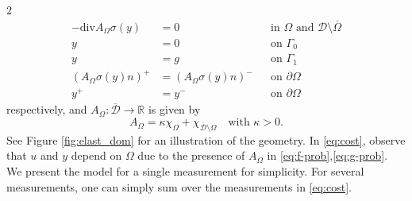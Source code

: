 \documentclass[a4paper, oneside]{article}
\newcommand{\Om}{\Omega}
\begin{document}
\begin{multicols}{2}
\begin{equation}
	\begin{aligned}
    -\mathrm{div} A_{\Omega} \sigma(y) &= 0 && \text{in } \Om  \text{ and } \mathcal{D}\setminus\overline \Omega \\
                                     y &= 0 && \text{on } \Gamma_{0} \\
                                     y &= g && \text{on } \Gamma_{1}   \\
			 (A_{\Omega} \sigma(y)n)^+ &= (A_{\Omega} \sigma(y)n)^- && \text{on } \partial\Omega\\      
								   y^+ &= y^- && \text{on } \partial\Om       
	\end{aligned}
\end{equation}
respectively, and $A_{\Omega}:\overline{\mathcal{D}} \rightarrow \mathds{R}$ is given by
\begin{equation}\label{eq:AOmega}
A_{\Omega} = \kappa\chi_{\Omega} + \chi_{\overline{\mathcal{D}}\setminus\Omega}
\quad \text{with }\kappa>0.
\end{equation}
See Figure \ref{fig:elast_dom} for an illustration of the geometry. In \eqref{eq:cost}, observe that $u$ and $y$ depend on $\Omega$ due to
the presence of $A_\Omega$ in \eqref{eq:f-prob},\eqref{eq:g-prob}.
We present the model for a single measurement for simplicity. 
For several measurements, one can simply sum over the measurements in \eqref{eq:cost}.


\end{multicols}
\end{document}
